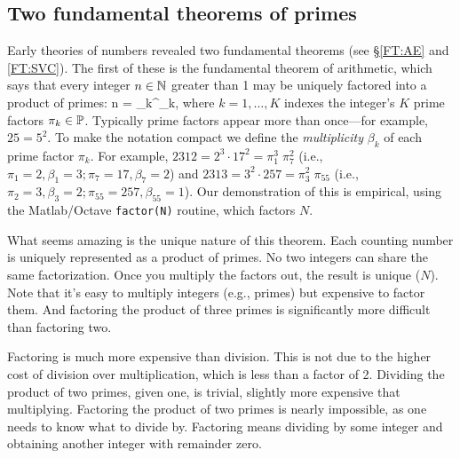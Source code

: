\documentclass{ximera}
\begin{document}
\subsection{Two fundamental theorems of primes}
Early theories of numbers revealed two fundamental theorems (see \S\ref{FT:AE} and \ref{FT:SVC}). The first of these is
the fundamental theorem of arithmetic, which says that every integer $n\in\N$ greater than 1 may
be uniquely factored into a product of primes:
 \be
n =  \pi_k^{\beta_k},
\label{eq:PrimeFactors}
 \ee
where $k= 1,\ldots,K$ indexes the integer's $K$ prime factors $\pi_k\in\P$.
Typically prime factors appear more than once---for example, $25=5^2$. To make the notation compact
we define the \emph{multiplicity} $\beta_k$ of each prime factor $\pi_k$.  For example,
$2312 = 2^3 \cdot 17^2 = \pi_1^3 \; \pi_7^2 $ (i.e., $ \pi_1=2, \beta_1=3; \pi_7=17, \beta_{7}=2 $) and
$2313 = 3^2 \cdot 257 = \pi_3^2 \; \pi_{55} $ (i.e., $\pi_2=3, \beta_3=2; \pi_{55}=257, \beta_{55}=1$).
Our demonstration of this is empirical, using the Matlab/Octave \texttt{factor(N)} routine, which
factors $N$.%

What seems amazing is the unique nature of this theorem.  Each counting number is uniquely
represented as a product of primes. No two integers can share the same factorization.
Once you multiply the factors out, the result is unique ($N$). Note that it's easy to multiply
integers (e.g., primes) but expensive to factor them. And factoring the product of three primes
is significantly more difficult than factoring two.

Factoring is much more expensive than division. This is not due to the higher cost of division
over multiplication, which is less than a factor of 2.%
Dividing the product of two primes, given one, is trivial, slightly more expensive that multiplying.
Factoring the product of two primes is nearly impossible, as one needs to know what to divide by.
Factoring means dividing by some integer and obtaining another integer with remainder zero.
\end{document}
